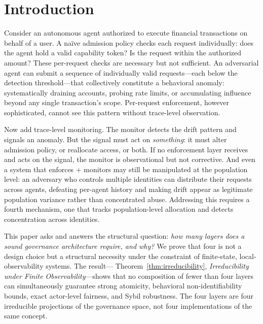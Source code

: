 \documentclass[11pt]{article}
\begin{document}
\tableofcontents
\newpage

\section{Introduction}
\label{sec:intro}

Consider an autonomous agent authorized to execute financial transactions on
behalf of a user. A na\"{i}ve admission policy checks each request individually:
does the agent hold a valid capability token? Is the request within the
authorized amount? These per-request checks are necessary but not sufficient.
An adversarial agent can submit a sequence of individually valid requests---each
below the detection threshold---that collectively constitute a behavioral
anomaly: systematically draining accounts, probing rate limits, or accumulating
influence beyond any single transaction's scope. Per-request enforcement,
however sophisticated, cannot see this pattern without trace-level observation.

Now add trace-level monitoring. The monitor detects the drift pattern and
signals an anomaly. But the signal must act on \emph{something}: it must alter
admission policy, or reallocate access, or both. If no enforcement layer
receives and acts on the signal, the monitor is observational but not
corrective. And even a system that enforces + monitors may still be
manipulated at the population level: an adversary who controls multiple
identities can distribute their requests across agents, defeating per-agent
history and making drift appear as legitimate population variance rather than
concentrated abuse. Addressing this requires a fourth mechanism, one that
tracks population-level allocation and detects concentration across identities.

This paper asks and answers the structural question: \emph{how many
layers does a sound governance architecture require, and why?} We prove that
four is not a design choice but a structural necessity under the constraint
of finite-state, local-observability systems. The result---
Theorem~\ref{thm:irreducibility}, \emph{Irreducibility under Finite
Observability}---shows that no composition of fewer than four layers can
simultaneously guarantee strong atomicity, behavioral non-identifiability
bounds, exact actor-level fairness, and Sybil robustness. The four layers
are four irreducible projections of the governance space, not four
implementations of the same concept.
\end{document}
